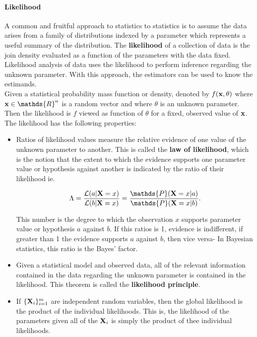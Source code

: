 \documentclass{homework}
\begin{document}
\paragraph{Likelihood}

A common and fruitful approach to statistics to statistics is to assume the data arises from a family of distributions indexed by a parameter which represents a useful summary of the distribution. The \textbf{likelihood} of a collection of data is the join density evaluated as a function of the parameters with the data fixed. Likelihood analysis of data uses the likelihood to perform inference regarding the unknown parameter. With this approach, the estimators can be used to know the estimands. \\

Given a statistical probability mass function or density, denoted by $f({\bf x}, \theta)$ where ${\bf x} \in \mathds{R}^n$ is a random vector and where $\theta$ is an unknown parameter. Then the likelihood is $f$ viewed as function of $\theta$ for a fixed, observed value of ${\bf x}$. \\

The likelihood has the following properties:

\begin{itemize}
    \item Ratios of likelihood values measure the relative evidence of one value of the unknown parameter to another. This is called the \textbf{law of likelihood}, which is the notion that the extent to which the evidence supports one parameter value or hypothesis against another is indicated by the ratio of their likelihood ie.
    
    $$
    \Lambda = \frac{\mathcal{L}(a | {\bf X}=x)}{\mathcal{L}(b | {\bf X}=x)} = \frac{\mathds{P}({\bf X}=x|a)}{\mathds{P}({\bf X}=x|b)}.
    $$
    
    This number is the degree to which the observation $x$ supports parameter value or hypothesis $a$ against $b$. If this ratios is 1, evidence is indifferent, if greater than 1 the evidence supports $a$ against $b$, then vice versa- In Bayesian statistics, this ratio is the Bayes' factor. \item Given a statistical model and observed data, all of the relevant information contained in the data regarding the unknown parameter is contained in the likelihood. This theorem is called the \textbf{likelihood principle}.
    \item If $\{{\bf X}_i\}_{i=1}^{m}$ are independent random variables, then the global likelihood is the product of the individual likelihoods. This is, the likelihood of the parameters given all of the ${\bf X}_i$ is simply the product of thee individual likelihoods. 
\end{itemize}
\end{document}
